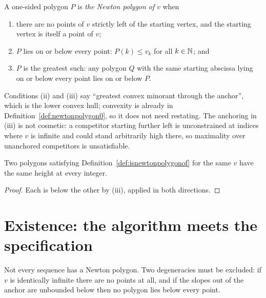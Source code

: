 \begin{definition}
  \label{def:isnewtonpolygonof}
  \leanok
  A one-sided polygon $P$ is \emph{the Newton polygon of} $v$ when
  \begin{enumerate}
    \item there are no points of $v$ strictly left of the starting vertex, and the starting
      vertex is itself a point of $v$;
    \item $P$ lies on or below every point: $P(k) \leq v_k$ for all $k \in \mathbb{N}$; and
    \item $P$ is the greatest such: any polygon $Q$ with the same starting abscissa lying on or
      below every point lies on or below $P$.
  \end{enumerate}
\end{definition}

Conditions (ii) and (iii) say ``greatest convex minorant through the anchor'', which is the lower
convex hull; convexity is already in Definition~\ref{def:newtonpolygon0}, so it does not need
restating.  The anchoring in (iii) is not cosmetic: a competitor starting further left is
unconstrained at indices where $v$ is infinite and could stand arbitrarily high there, so
maximality over unanchored competitors is unsatisfiable.

\begin{theorem}[Uniqueness]
  \label{thm:np-unique}
  \leanok
  Two polygons satisfying Definition~\ref{def:isnewtonpolygonof} for the same $v$ have the same
  height at every integer.
\end{theorem}

\begin{proof}
  \leanok
  Each is below the other by (iii), applied in both directions.
\end{proof}


\section{Existence: the algorithm meets the specification}

Not every sequence has a Newton polygon.  Two degeneracies must be excluded: if $v$ is
identically infinite there are no points at all, and if the slopes out of the anchor are
unbounded below then no polygon lies below every point.

